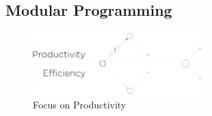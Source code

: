 \subsection{Modular Programming} \label{chapter3:software-productivity:modularity}

\begin{figure}[!h]
\begin{center}
\includegraphics[width=0.6\textwidth]{../resources/state-of-the-art-1.pdf}
\end{center}
\caption{Focus on Productivity}
\label{fig:state-of-the-art-1}
\end{figure}







